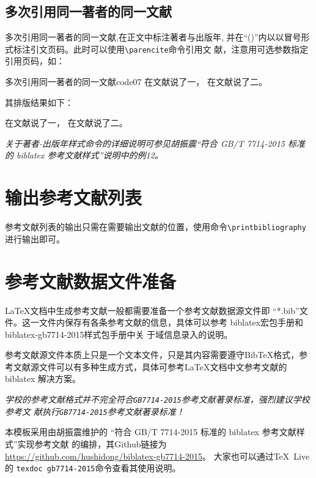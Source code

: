 \documentclass{ctexbook}
\newcommand\cs[1]{\texttt{\textbackslash#1}}
\newcommand{\note}[1]{{%
  \color{magenta}{\bfseries 注意：}\emph{#1}}}
\begin{document}
\subsection{多次引用同一著者的同一文献}

多次引用同一著者的同一文献,在正文中标注著者与出版年,
并在\enquote{()}内以以冒号形式标注引文页码。此时可以使用\cs{parencite}命令引用文
献，注意用可选参数指定引用页码，如：

\begin{codetex}{多次引用同一著者的同一文献}{code07}
  在文献\parencite[20-22]{n21}说了一， 在文献\parencite[55-60]{n21}说了二。%
\end{codetex}

其排版结果如下：

\begin{center}
  \begin{boxedminipage}{0.9\textwidth}
    \small
    在文献\parencite[20-22]{n21}说了一， 在文献\parencite[55-60]{n21}说了二。%
  \end{boxedminipage}
\end{center}

\note{关于著者-出版年样式命令的详细说明可参见胡振震\enquote{符合 GB/T
  7714-2015 标准的 biblatex 参考文献样式}说明中的例12。}

\section{输出参考文献列表}

参考文献列表的输出只需在需要输出文献的位置，使用命令\cs{printbibliography}进行输出即可。

\section{参考文献数据文件准备}

\LaTeX 文档中生成参考文献一般都需要准备一个参考文献数据源文件即
\enquote{*.bib}文件。这一文件内保存有各条参考文献的信息，具体可以参考
biblatex宏包手册和biblatex-gb7714-2015样式包手册\cite{胡振震2019}中关
于域信息录入的说明。

参考文献源文件本质上只是一个文本文件，只是其内容需要遵守BibTeX格式，参
考文献源文件可以有多种生成方式，具体可参考\LaTeX{}文档中文参考文献的
biblatex 解决方案\parencite[2.2节]{胡振震2016}。

\note{学校的参考文献格式并不完全符合\texttt{GB7714-2015}参考文献著录标准，强烈建议学校参考文
  献执行\texttt{GB7714-2015}参考文献著录标准！}

本模板采用由胡振震维护的
\enquote{符合 GB/T 7714-2015 标准的 biblatex 参考文献样式}实现参考文献
的编排\cite{胡振震2019}，其Github链接为
\url{https://github.com/hushidong/biblatex-gb7714-2015}。
大家也可以通过\TeX~Live的 \verb|texdoc gb7714-2015|命令查看其使用说明。
\end{document}
